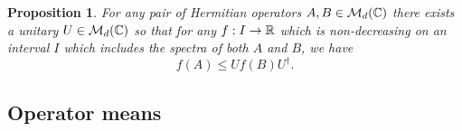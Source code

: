 \documentclass[11pt,a4paper]{article}
\theoremstyle{plain}
\newtheorem{proposition}{Proposition}[section]
\theoremstyle{definition}
\theoremstyle{remark}
\numberwithin{equation}{section}
\begin{document}
\begin{proposition}
    For any pair of Hermitian operators $A,B\in \mathcal{M}_d(\mathbb{C})$ there exists a unitary
    $U\in \mathcal{M}_d(\mathbb{C})$ so that for any $f:I\to \mathbb{R}$ which is non-decreasing on an interval
    $I$ which includes the spectra of both $A$ and $B$, we have
    \begin{equation}\label{eq:5.57}
        f(A) \le U f(B) U^\dagger.
    \end{equation}
\end{proposition}

\subsection{Operator means}
\end{document}
